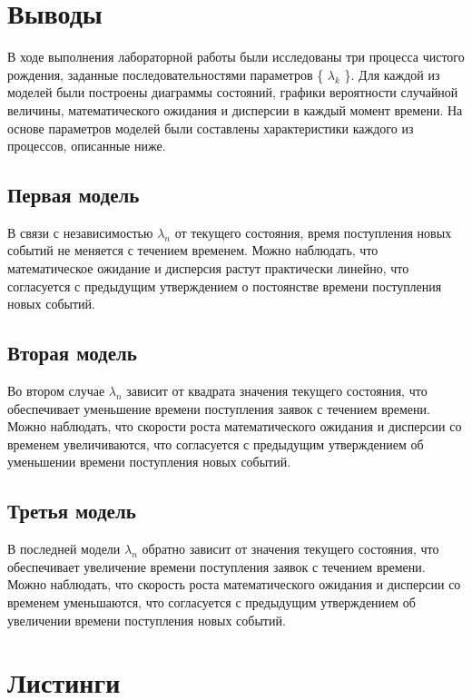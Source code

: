 \section*{Выводы}

В ходе выполнения лабораторной работы были исследованы три процесса чистого рождения, заданные последовательностями
параметров \{ $\lambda_k$ \}.
Для каждой из моделей были построены диаграммы состояний, графики вероятности случайной величины, математического
ожидания и дисперсии в каждый момент времени.
На основе параметров моделей были составлены характеристики каждого из процессов, описанные ниже.

\subsection*{Первая модель}

В связи с независимостью $\lambda_n$ от текущего состояния, время поступления новых событий не меняется с течением временем.
Можно наблюдать, что математическое ожидание и дисперсия растут практически линейно, что согласуется с предыдущим
утверждением о постоянстве времени поступления новых событий.

\subsection*{Вторая модель}

Во втором случае $\lambda_n$ зависит от квадрата значения текущего состояния, что обеспечивает уменьшение времени поступления
заявок с течением времени.
Можно наблюдать, что скорости роста математического ожидания и дисперсии со временем увеличиваются, что согласуется с
предыдущим утверждением об уменьшении времени поступления новых событий.

\subsection*{Третья модель}

В последней модели $\lambda_n$ обратно зависит от значения текущего состояния, что обеспечивает увеличение времени поступления
заявок с течением времени.
Можно наблюдать, что скорость роста математического ожидания и дисперсии со временем уменьшаются, что согласуется с
предыдущим утверждением об увеличении времени поступления новых событий.

\section*{Листинги}

